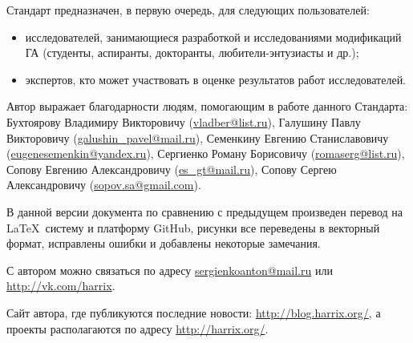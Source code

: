 Стандарт предназначен, в первую очередь, для следующих пользователей:
\begin{itemize}
\item исследователей, занимающиеся  разработкой и исследованиями модификаций ГА (студенты, аспиранты, докторанты, любители-энтузиасты и др.);
\item экспертов, кто может участвовать в оценке результатов работ исследователей.
\end{itemize}


Автор выражает благодарности людям, помогающим в работе данного Стандарта: Бухтоярову Владимиру Викторовичу (\href{mailto:vladber@list.ru}{vladber@list.ru}), Галушину Павлу Викторовичу (\href{mailto:galushin\_pavel@mail.ru}{galushin\_pavel@mail.ru}), Семенкину Евгению Станиславовичу (\href{mailto:eugenesemenkin@yandex.ru}{eugenesemenkin@yandex.ru}), Сергиенко Роману Борисовичу (\href{mailto:romaserg@list.ru}{romaserg@list.ru}), Сопову Евгению Александровичу (\href{mailto:es\_gt@mail.ru}{es\_gt@mail.ru}), Сопову Сергею Александровичу (\href{mailto:sopov.sa@gmail.com}{sopov.sa@gmail.com}).

В данной версии документа по сравнению с предыдущем произведен перевод на \LaTeX\ систему и платформу GitHub, рисунки все переведены в векторный формат, исправлены ошибки и добавлены некоторые замечания.

С автором можно связаться по адресу \href{mailto:sergienkoanton@mail.ru}{sergienkoanton@mail.ru} или  \href{http://vk.com/harrix}{http://vk.com/harrix}.

Сайт автора, где публикуются последние новости: \href{http://blog.harrix.org/}{http://blog.harrix.org/}, а проекты располагаются по адресу \href{http://harrix.org/}{http://harrix.org/}.

\singlespacing
\clearpage